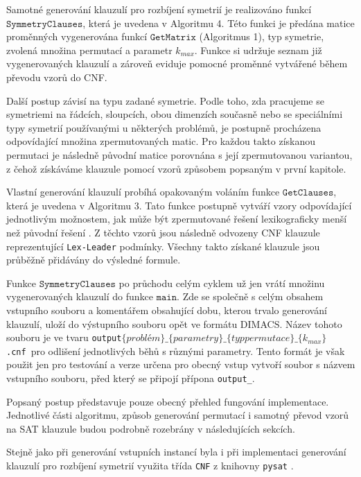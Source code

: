 Samotné generování klauzulí pro rozbíjení symetrií je realizováno funkcí $\texttt{SymmetryClauses}$, která je uvedena v Algoritmu 4. Této funkci je předána matice proměnných vygenerována funkcí $\texttt{GetMatrix}$ (Algoritmus 1), typ symetrie, zvolená množina permutací a parametr $k_{max}$. Funkce si udržuje seznam již vygenerovaných klauzulí a zároveň eviduje pomocné proměnné vytvářené během převodu vzorů do CNF.

Další postup závisí na typu zadané symetrie. Podle toho, zda pracujeme se symetriemi na řádcích, sloupcích, obou dimenzích současně nebo se speciálními typy symetrií používanými u některých problémů, je postupně procházena odpovídající množina zpermutovaných matic. Pro každou takto získanou permutaci je následně původní matice porovnána s její zpermutovanou variantou, z čehož získáváme klauzule pomocí vzorů způsobem popsaným v první kapitole.

Vlastní generování klauzulí probíhá opakovaným voláním funkce $\texttt{GetClauses}$, která je uvedena v Algoritmu 3. Tato funkce postupně vytváří vzory odpovídající jednotlivým možnostem, jak může být zpermutované řešení lexikograficky menší než původní řešení \cite{codish2025breakingsymmetriessetcoveringperspective}. Z těchto vzorů jsou následně odvozeny CNF klauzule reprezentující \texttt{Lex-Leader} podmínky. Všechny takto získané klauzule jsou průběžně přidávány do výsledné formule.

Funkce $\texttt{SymmetryClauses}$ po průchodu celým cyklem už jen vrátí množinu vygenerovaných klauzulí do funkce $\texttt{main}$. Zde se společně s celým obsahem vstupního souboru a komentářem obsahující dobu, kterou trvalo generování klauzulí, uloží do výstupního souboru opět ve formátu DIMACS. Název tohoto souboru je ve tvaru \texttt{output$\{problém\}\_\{parametry\}\_\{typ permutace\}\_\{k_{max}\}$.cnf} pro odlišení jednotlivých běhů s různými parametry. Tento formát je však použit jen pro testování a verze určena pro obecný vstup vytvoří soubor s názvem vstupního souboru, před který se připojí přípona \texttt{output\_}.

Popsaný postup představuje pouze obecný přehled fungování implementace. Jednotlivé části algoritmu, způsob generování permutací i samotný převod vzorů na SAT klauzule budou podrobně rozebrány v následujících sekcích.

Stejně jako při generování vstupních instancí byla i při implementaci generování klauzulí pro rozbíjení symetrií využita třída \texttt{CNF} z knihovny \texttt{pysat} \cite{imms-sat18}.

